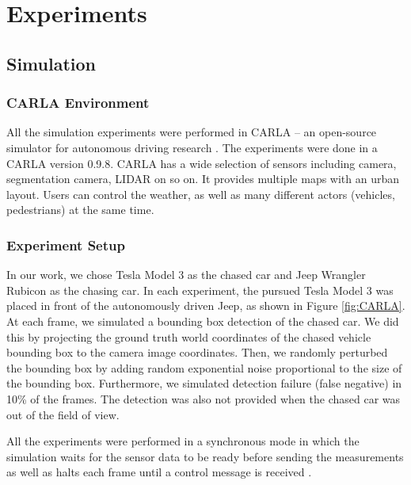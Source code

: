 \documentclass{ctuthesis/ctuthesis}
\begin{document}
\chapter{Experiments}\label{s:experiments}
\section{Simulation}
\subsection{CARLA Environment}
All the simulation experiments were performed in CARLA -- an open-source simulator for autonomous driving research \cite{CARLA}. The experiments were done in a CARLA version 0.9.8. CARLA has a wide selection of sensors including camera, segmentation camera, LIDAR on so on. It provides multiple maps with an urban layout. Users can control the weather, as well as many different actors (vehicles, pedestrians) at the same time. \par




\subsection{Experiment Setup}
In our work, we chose Tesla Model 3 as the chased car and Jeep Wrangler Rubicon as the chasing car. In each experiment, the pursued Tesla Model 3 was placed in front of the autonomously driven Jeep, as shown in Figure \ref{fig:CARLA}. At each frame, we simulated a bounding box detection of the chased car. We did this by projecting the ground truth world coordinates of the chased vehicle bounding box to the camera image coordinates. Then, we randomly perturbed the bounding box by adding random exponential noise proportional to the size of the bounding box. Furthermore, we simulated detection failure (false negative) in 10\% of the frames. The detection was also not provided when the chased car was out of the field of view.\par

All the experiments were performed in a synchronous mode in which the simulation waits for the sensor data to be ready before sending the measurements as well as halts each frame until a control message is received \cite{CARLA}. \par
\end{document}
